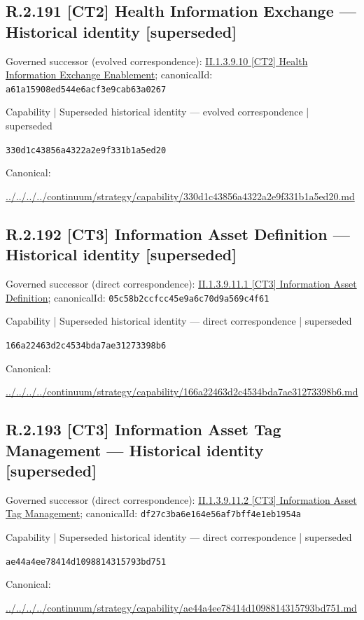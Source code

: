 \documentclass[10pt,a4paper]{article}
\begin{document}
\subsection*{R.2.191 [CT2] Health Information Exchange — Historical identity [superseded]}
Governed successor (evolved correspondence): \hyperref[element-a61a15908ed544e6acf3e9cab63a0267]{II.1.3.9.10 [CT2] Health Information Exchange Enablement}; canonicalId: \texttt{a61a15908ed544e6acf3e9cab63a0267}\par
\label{element-330d1c43856a4322a2e9f331b1a5ed20}
{\small Capability | Superseded historical identity — evolved correspondence | superseded}\par
\texttt{330d1c43856a4322a2e9f331b1a5ed20}\par
Canonical: \par
{\footnotesize\url{../../../../continuum/strategy/capability/330d1c43856a4322a2e9f331b1a5ed20.md}}\par
\subsection*{R.2.192 [CT3] Information Asset Definition — Historical identity [superseded]}
Governed successor (direct correspondence): \hyperref[element-05c58b2ccfcc45e9a6c70d9a569c4f61]{II.1.3.9.11.1 [CT3] Information Asset Definition}; canonicalId: \texttt{05c58b2ccfcc45e9a6c70d9a569c4f61}\par
\label{element-166a22463d2c4534bda7ae31273398b6}
{\small Capability | Superseded historical identity — direct correspondence | superseded}\par
\texttt{166a22463d2c4534bda7ae31273398b6}\par
Canonical: \par
{\footnotesize\url{../../../../continuum/strategy/capability/166a22463d2c4534bda7ae31273398b6.md}}\par
\subsection*{R.2.193 [CT3] Information Asset Tag Management — Historical identity [superseded]}
Governed successor (direct correspondence): \hyperref[element-df27c3ba6e164e56af7bff4e1eb1954a]{II.1.3.9.11.2 [CT3] Information Asset Tag Management}; canonicalId: \texttt{df27c3ba6e164e56af7bff4e1eb1954a}\par
\label{element-ae44a4ee78414d1098814315793bd751}
{\small Capability | Superseded historical identity — direct correspondence | superseded}\par
\texttt{ae44a4ee78414d1098814315793bd751}\par
Canonical: \par
{\footnotesize\url{../../../../continuum/strategy/capability/ae44a4ee78414d1098814315793bd751.md}}\par
\end{document}

